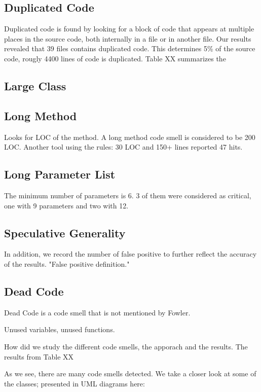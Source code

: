 \subsection{Duplicated Code}
Duplicated code is found by looking for a block of code that appears at multiple places in the source code, both internally in a file or in another file. Our results revealed that 39 files contains duplicated code. This determines 5\% of the source code, rougly 4400 lines of code is duplicated. Table XX summarizes the

\subsection{Large Class}

\subsection{Long Method}
Looks for LOC of the method. A long method code smell is considered to be 200 LOC. Another tool using the rules: 30 LOC and 150+ lines reported 47 hits. 



\subsection{Long Parameter List}
The minimum number of parameters is 6. 3 of them were considered as critical, one with 9 parameters and two with 12. 

\subsection{Speculative Generality}

In addition, we record the number of false positive to further reflect the accuracy of the results. "False positive definition." 

\subsection{Dead Code}
Dead Code is a code smell that is not mentioned by Fowler. 

Unused variables, unused functions. 







How did we study the different code smells, the apporach and the results.
The results from Table XX

As we see, there are many code smells detected. We take a closer look at some of the classes; presented in UML diagrams here:





















